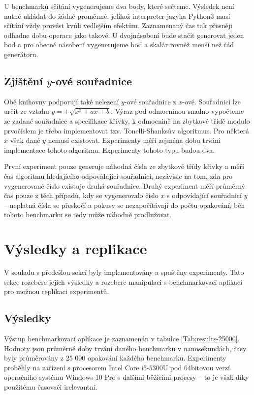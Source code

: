 \documentclass{article}
\theoremstyle{definition}
\begin{document}
U benchmarků sčítání vygenerujeme dva body, které sečteme. Výsledek není nutné ukládat do žádné proměnné, jelikož interpreter jazyka Python3 musí sčítání vždy provést kvůli vedlejším efektům. Zaznamenaný čas tak přesněji odhadne dobu operace jako takové. U dvojnásobení bude stačit generovat jeden bod a pro obecné násobení vygenerujeme bod a skalár rovněž menší než řád generátoru.

\subsection{Zjištění $y$-ové souřadnice}
Obě knihovny podporují také nelezení $y$-ové souřadnice z $x$-ové. Souřadnici lze určit ze vztahu $y = \pm \sqrt{x^3 + ax + b}$. Výraz pod odmocninou snadno vypočteme ze zadané souřadnice a specifikace křivky, k odmocnině na zbytkové třídě modulo prvočíslem je třeba implementovat tzv. Tonelli-Shanksův algoritmus. Pro některá $x$ však dané $y$ nemusí existovat. Experimenty měří zejména dobu trvání implementace tohoto algoritmu. Experimenty tohoto typu budou dva. 

První experiment pouze generuje náhodná čísla ze zbytkové třídy křivky a měří čas algoritmu hledajícího odpovídající souřadnici, nezávisle na tom, zda pro vygenerované číslo existuje druhá souřadnice. Druhý experiment měří průměrný čas pouze z těch případů, kdy se vygenerovalo číslo $x$ s odpovídající souřadnicí $y$ -- neplatná čísla se přeskočí a pokusy se nezapočítávají do počtu opakování, běh tohoto benchmarku se tedy může náhodně prodlužovat.

\section{Výsledky a replikace}
V souladu s předešlou sekcí byly implementovány a spuštěny experimenty. Tato sekce rozebere jejich výsledky a rozebere manipulaci s benchmarkovací aplikací pro možnou replikaci experimentů.

\subsection{Výsledky}
Výstup benchmarkovací aplikace je zaznamenán v tabulce \ref{Tab:results-25000}. Hodnoty jsou průměrné doby trvání daného benchmarku v nanosekundách, časy byly průměrovány z 25 000 opakování každého benchmarku. Experimenty proběhly na zařízení s procesorem Intel Core i5-5300U pod 64bitovou verzí operačního systému Windows 10 Pro s dalšími běžícími procesy -- to je však díky použitému časovači irelevantní.
\end{document}
